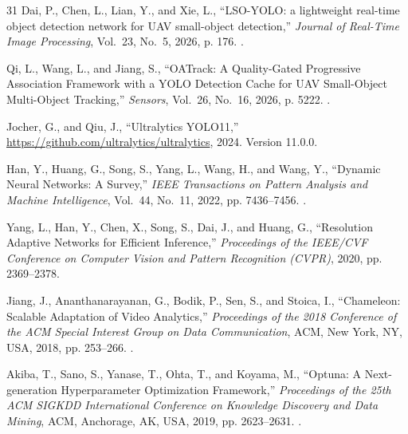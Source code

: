 \documentclass[journal]{new-aiaa}
\begin{document}
\begin{thebibliography}{31}
Dai, P., Chen, L., Lian, Y., and Xie, L., \enquote{{LSO-YOLO: a lightweight
  real-time object detection network for UAV small-object detection},}
  \emph{Journal of Real-Time Image Processing}, Vol.~23, No.~5, 2026, p. 176.
\newblock {}.

Qi, L., Wang, L., and Jiang, S., \enquote{{OATrack: A Quality-Gated Progressive
  Association Framework with a YOLO Detection Cache for UAV Small-Object
  Multi-Object Tracking},} \emph{Sensors}, Vol.~26, No.~16, 2026, p. 5222.
\newblock {}.

Jocher, G., and Qiu, J., \enquote{{Ultralytics YOLO11},}
  \url{https://github.com/ultralytics/ultralytics}, 2024.
\newblock Version 11.0.0.

Han, Y., Huang, G., Song, S., Yang, L., Wang, H., and Wang, Y.,
  \enquote{{Dynamic Neural Networks: A Survey},} \emph{IEEE Transactions on
  Pattern Analysis and Machine Intelligence}, Vol.~44, No.~11, 2022, pp.
  7436--7456.
\newblock {}.

Yang, L., Han, Y., Chen, X., Song, S., Dai, J., and Huang, G.,
  \enquote{{Resolution Adaptive Networks for Efficient Inference},}
  \emph{Proceedings of the IEEE/CVF Conference on Computer Vision and Pattern
  Recognition (CVPR)}, 2020, pp. 2369--2378.

Jiang, J., Ananthanarayanan, G., Bodik, P., Sen, S., and Stoica, I.,
  \enquote{{Chameleon: Scalable Adaptation of Video Analytics},}
  \emph{Proceedings of the 2018 Conference of the ACM Special Interest Group on
  Data Communication}, ACM, New York, NY, USA, 2018, pp. 253--266.
\newblock {}.

Akiba, T., Sano, S., Yanase, T., Ohta, T., and Koyama, M., \enquote{{Optuna: A
  Next-generation Hyperparameter Optimization Framework},} \emph{Proceedings of
  the 25th ACM SIGKDD International Conference on Knowledge Discovery and Data
  Mining}, ACM, Anchorage, AK, USA, 2019, pp. 2623--2631.
\newblock {}.


\end{thebibliography}
\end{document}
